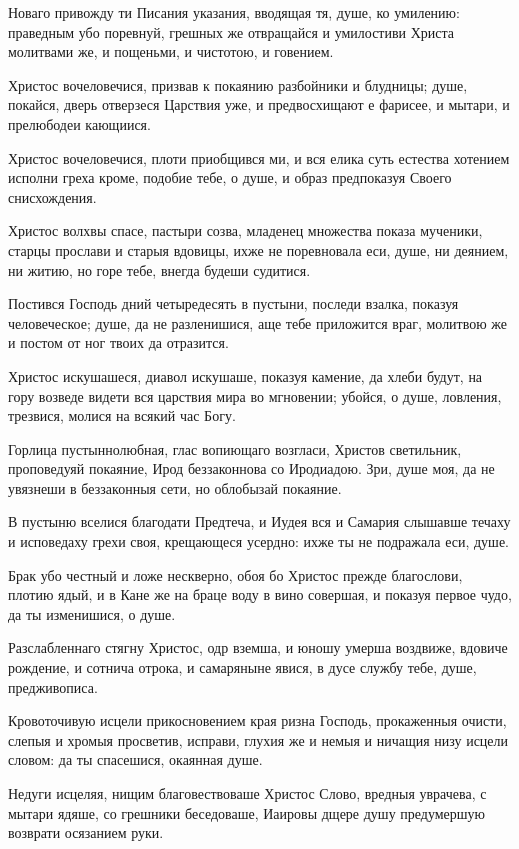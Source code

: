 Новаго привожду ти Писания указания, вводящая тя, душе, ко умилению: праведным убо поревнуй, грешных же отвращайся и умилостиви Христа молитвами же, и пощеньми, и чистотою, и говением.


Христос вочеловечися, призвав к покаянию разбойники и блудницы; душе, покайся, дверь отверзеся Царствия уже, и предвосхищают е фарисее, и мытари, и прелюбодеи кающиися.


Христос вочеловечися, плоти приобщився ми, и вся елика суть естества хотением исполни греха кроме, подобие тебе, о душе, и образ предпоказуя Своего снисхождения.


Христос волхвы спасе, пастыри созва, младенец множества показа мученики, старцы прослави и старыя вдовицы, ихже не поревновала еси, душе, ни деянием, ни житию, но горе тебе, внегда будеши судитися.


Постився Господь дний четыредесять в пустыни, последи взалка, показуя человеческое; душе, да не разленишися, аще тебе приложится враг, молитвою же и постом от ног твоих да отразится.


Христос искушашеся, диавол искушаше, показуя камение, да хлеби будут, на гору возведе видети вся царствия мира во мгновении; убойся, о душе, ловления, трезвися, молися на всякий час Богу.


Горлица пустыннолюбная, глас вопиющаго возгласи, Христов светильник, проповедуяй покаяние, Ирод беззаконнова со Иродиадою. Зри, душе моя, да не увязнеши в беззаконныя сети, но облобызай покаяние.


В пустыню вселися благодати Предтеча, и Иудея вся и Самария слышавше течаху и исповедаху грехи своя, крещающеся усердно: ихже ты не подражала еси, душе.


Брак убо честный и ложе нескверно, обоя бо Христос прежде благослови, плотию ядый, и в Кане же на браце воду в вино совершая, и показуя первое чудо, да ты изменишися, о душе.


Разслабленнаго стягну Христос, одр вземша, и юношу умерша воздвиже, вдовиче рождение, и сотнича отрока, и самаряныне явися, в дусе службу тебе, душе, предживописа.


Кровоточивую исцели прикосновением края ризна Господь, прокаженныя очисти, слепыя и хромыя просветив, исправи, глухия же и немыя и ничащия низу исцели словом: да ты спасешися, окаянная душе.


Недуги исцеляя, нищим благовествоваше Христос Слово, вредныя уврачева, с мытари ядяше, со грешники беседоваше, Иаировы дщере душу предумершую возврати осязанием руки.


